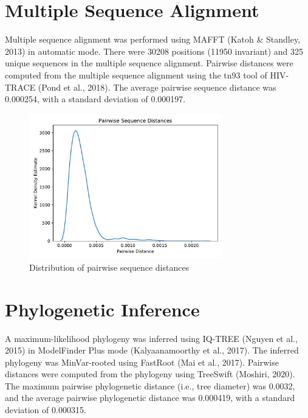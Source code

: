 \documentclass{article}
\begin{document}
\section{Multiple Sequence Alignment}
Multiple sequence alignment was performed using MAFFT (Katoh \& Standley, 2013) in automatic mode.
There were 30208 positions (11950 invariant) and 325 unique sequences in the multiple sequence alignment.
Pairwise distances were computed from the multiple sequence alignment using the tn93 tool of HIV-TRACE (Pond et al., 2018).
The average pairwise sequence distance was 0.000254,
with a standard deviation of 0.000197.


\begin{figure}[h]
\centering
\includegraphics[width=0.75\textwidth,keepaspectratio]{./figs/pairwise_distances_sequences.pdf}
\caption{Distribution of pairwise sequence distances}
\end{figure}

\section{Phylogenetic Inference}
A maximum-likelihood phylogeny was inferred using IQ-TREE (Nguyen et al., 2015) in ModelFinder Plus mode (Kalyaanamoorthy et al., 2017).
The inferred phylogeny was MinVar-rooted using FastRoot (Mai et al., 2017).
Pairwise distances were computed from the phylogeny using TreeSwift (Moshiri, 2020).
The maximum pairwise phylogenetic distance (i.e., tree diameter) was 0.0032,
and the average pairwise phylogenetic distance was 0.000419,
with a standard deviation of 0.000315.
\end{document}
